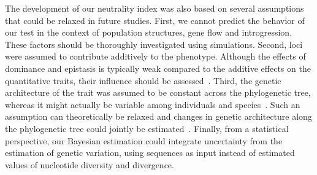 \documentclass{article}
\begin{document}
The development of our neutrality index was also based on several assumptions that could be relaxed in future studies.
First, we cannot predict the behavior of our test in the context of population structures, gene flow and introgression.
These factors should be thoroughly investigated using simulations.
Second, loci were assumed to contribute additively to the phenotype.
Although the effects of dominance and epistasis is typically weak compared to the additive effects on the quantitative traits, their influence should be assessed~\citep{hill_data_2008, crow_epistasis_2010}.
Third, the genetic architecture of the trait was assumed to be constant across the phylogenetic tree, whereas it might actually be variable among individuals and species~\citep{tung_genetic_2015, huber_conservatism_2015}.
Such an assumption can theoretically be relaxed and changes in genetic architecture along the phylogenetic tree could jointly be estimated~\citep{arnold_understanding_2008, hohenlohe_mipod_2008, kostikova_bridging_2016, gaboriau_multiplatform_2020}.
Finally, from a statistical perspective, our Bayesian estimation could integrate uncertainty from the estimation of genetic variation, using sequences as input instead of estimated values of nucleotide diversity and divergence.
\end{document}
